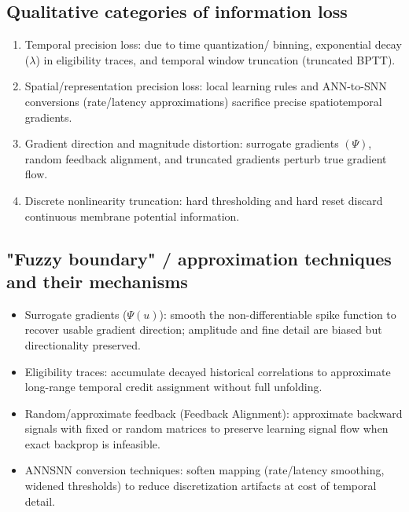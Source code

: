 \documentclass{article}
\begin{document}
\subsection{Qualitative categories of information loss}
\begin{enumerate}
  \item Temporal precision loss: due to time quantization/ binning, exponential decay ($\lambda$) in eligibility traces, and temporal window truncation (truncated BPTT).
  \item Spatial/representation precision loss: local learning rules and ANN-to-SNN conversions (rate/latency approximations) sacrifice precise spatiotemporal gradients.
  \item Gradient direction and magnitude distortion: surrogate gradients $(\Psi)$, random feedback alignment, and truncated gradients perturb true gradient flow.
  \item Discrete nonlinearity truncation: hard thresholding and hard reset discard continuous membrane potential information.
\end{enumerate}

\subsection{"Fuzzy boundary" / approximation techniques and their mechanisms}
\begin{itemize}
  \item Surrogate gradients ($\Psi(u)$): smooth the non-differentiable spike function to recover usable gradient direction; amplitude and fine detail are biased but directionality preserved.
  \item Eligibility traces: accumulate decayed historical correlations to approximate long-range temporal credit assignment without full unfolding.
  \item Random/approximate feedback (Feedback Alignment): approximate backward signals with fixed or random matrices to preserve learning signal flow when exact backprop is infeasible.
  \item ANN\textrightarrow SNN conversion techniques: soften mapping (rate/latency smoothing, widened thresholds) to reduce discretization artifacts at cost of temporal detail.
\end{itemize}
\end{document}
